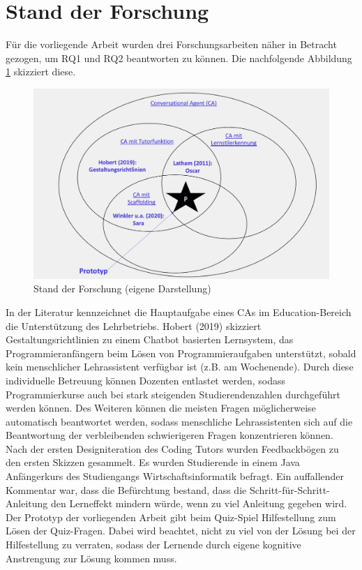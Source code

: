     \section{Stand der Forschung} \label{StandderForschung}

    Für die vorliegende Arbeit wurden drei Forschungsarbeiten näher in Betracht gezogen, um RQ1 und RQ2 beantworten zu können.
    Die nachfolgende Abbildung \ref{fig:forschung} skizziert diese.
 
    \begin{figure}[H]
        \centering
        \includegraphics[width=0.9\linewidth]{images/forschung.png}
        \caption[Stand der Forschung]{Stand der Forschung (eigene Darstellung)}
        \label{fig:forschung}
    \end{figure}
    
    In der Literatur kennzeichnet die Hauptaufgabe eines CAs im Education-Bereich die Unterstützung des Lehrbetriebs.
    Hobert (2019) skizziert Gestaltungsrichtlinien zu einem Chatbot basierten Lernsystem, das
    Programmieranfängern beim Lösen von Programmieraufgaben unterstützt, 
    sobald kein menschlicher Lehrassistent verfügbar ist (z.B. am Wochenende).
    Durch diese individuelle Betreuung können Dozenten entlastet werden, sodass
    Programmierkurse auch bei stark steigenden Studierendenzahlen
    durchgeführt werden können. Des Weiteren können die
    meisten Fragen möglicherweise automatisch beantwortet werden, sodass  
    menschliche Lehrassistenten sich auf die Beantwortung der verbleibenden
    schwierigeren Fragen konzentrieren können. \parencite[5 ff.]{Hobert2019SayHT}
    Nach der ersten Designiteration des 
    Coding Tutors wurden Feedbackbögen zu den ersten Skizzen gesammelt.
    Es wurden Studierende in einem Java Anfängerkurs des 
    Studiengangs Wirtschaftsinformatik befragt. Ein auffallender Kommentar war, 
    dass die Befürchtung bestand, dass die \glqq Schritt-für-Schritt-Anleitung\grqq{} den Lerneffekt
    mindern würde, wenn zu viel Anleitung gegeben wird. \parencite[10]{Hobert2019SayHT}
    Der Prototyp der vorliegenden Arbeit gibt beim Quiz-Spiel Hilfestellung zum Lösen der Quiz-Fragen. 
    Dabei wird beachtet, nicht zu viel von der Lösung bei der Hilfestellung zu verraten, sodass 
    der Lernende durch eigene kognitive Anstrengung zur Lösung kommen muss.
        
